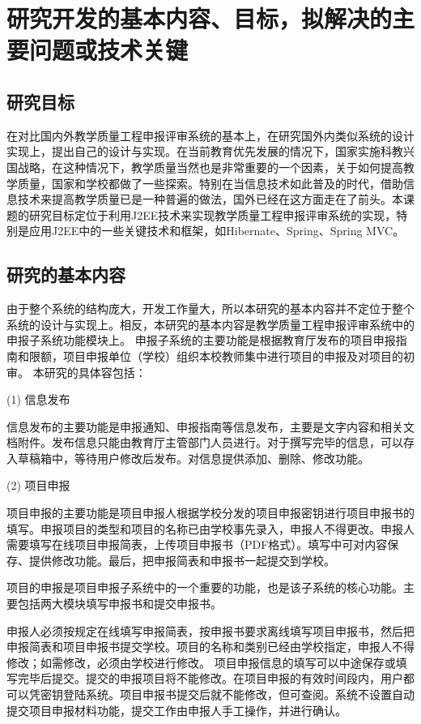 
\chapter{研究开发的基本内容、目标，拟解决的主要问题或技术关键}
\section{研究目标}
在对比国内外教学质量工程申报评审系统的基本上，在研究国外内类似系统的设计实现上，提出自己的设计与实现。在当前教育优先发展的情况下，国家实施科教兴国战略，在这种情况下，教学质量当然也是非常重要的一个因素，关于如何提高教学质量，国家和学校都做了一些探索。特别在当信息技术如此普及的时代，借助信息技术来提高教学质量已是一种普遍的做法，国外已经在这方面走在了前头。本课题的研究目标定位于利用J2EE技术来实现教学质量工程申报评审系统的实现，特别是应用J2EE中的一些关键技术和框架，如Hibernate、Spring、Spring MVC。

\section{研究的基本内容}
由于整个系统的结构庞大，开发工作量大，所以本研究的基本内容并不定位于整个系统的设计与实现上。相反，本研究的基本内容是教学质量工程申报评审系统中的申报子系统功能模块上。
申报子系统的主要功能是根据教育厅发布的项目申报指南和限额，项目申报单位（学校）组织本校教师集中进行项目的申报及对项目的初审。
本研究的具体容包括：

(1)	信息发布\par
信息发布的主要功能是申报通知、申报指南等信息发布，主要是文字内容和相关文档附件。发布信息只能由教育厅主管部门人员进行。对于撰写完毕的信息，可以存入草稿箱中，等待用户修改后发布。对信息提供添加、删除、修改功能。

(2)	项目申报\par
项目申报的主要功能是项目申报人根据学校分发的项目申报密钥进行项目申报书的填写。申报项目的类型和项目的名称已由学校事先录入，申报人不得更改。申报人需要填写在线项目申报简表，上传项目申报书（PDF格式）。填写中可对内容保存、提供修改功能。最后，把申报简表和申报书一起提交到学校。

项目的申报是项目申报子系统中的一个重要的功能，也是该子系统的核心功能。主要包括两大模块填写申报书和提交申报书。

申报人必须按规定在线填写申报简表，按申报书要求离线填写项目申报书，然后把申报简表和项目申报书提交学校。项目的名称和类别已经由学校指定，申报人不得修改；如需修改，必须由学校进行修改。
项目申报信息的填写可以中途保存或填写完毕后提交。提交的申报项目将不能修改。在项目申报的有效时间段内，用户都可以凭密钥登陆系统。项目申报书提交后就不能修改，但可查阅。系统不设置自动提交项目申报材料功能，提交工作由申报人手工操作，并进行确认。


